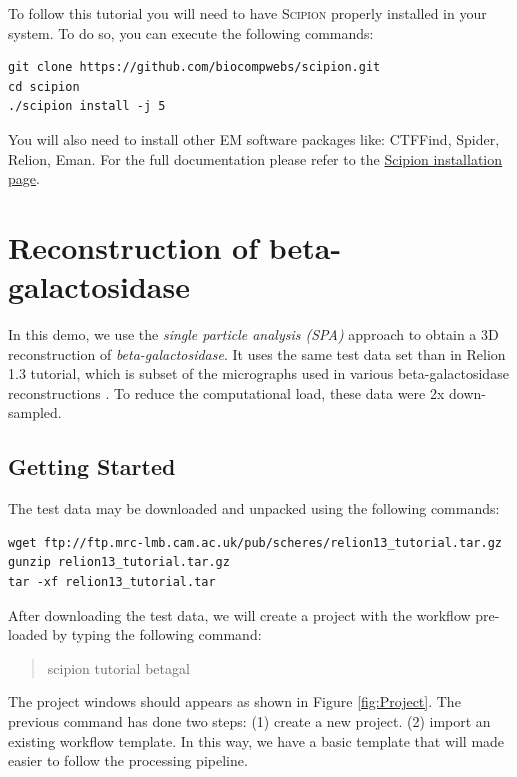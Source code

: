 \documentclass[12pt]{article} %
\newcommand{\scipion}{\textsc{Scipion} }
\newenvironment{command}{\tt\begin{quote}}{\end{quote}}
\begin{document}
To follow this tutorial you will need to have \scipion properly installed
in your system. To do so, you can execute the following commands:

\begin{verbatim} 
git clone https://github.com/biocompwebs/scipion.git
cd scipion
./scipion install -j 5
\end{verbatim}

You will also need to install other EM software packages like: 
CTFFind, Spider, Relion, Eman. For the full documentation please refer to the
\href{http://scipion.cnb.csic.es/docs/bin/view/TWiki/NewInstallation}{Scipion installation page}.


\section{Reconstruction of beta-galactosidase}

In this demo, we use the \emph{single particle analysis (SPA)}  approach to obtain
a 3D reconstruction of \emph{beta-galactosidase}. It uses the same test data set than
in Relion 1.3 tutorial, which is subset of the micrographs used in various beta-galactosidase reconstructions \citep{Chen2013, Sjors2012, Vinothkumar2014}.
To reduce
the computational load, these data were 2x down-sampled.


\subsection{Getting Started}

The test data may be downloaded and unpacked using the following commands:

\begin{verbatim}
wget ftp://ftp.mrc-lmb.cam.ac.uk/pub/scheres/relion13_tutorial.tar.gz
gunzip relion13_tutorial.tar.gz
tar -xf relion13_tutorial.tar
\end{verbatim}

After downloading the test data, we will create a project with the workflow pre-loaded
by typing the following command:

\begin{command}
 scipion tutorial betagal
\end{command}

The project windows should appears as shown in Figure \ref{fig:Project}. The previous command has done two 
steps: (1) create a new project. (2) import an existing workflow template. In this way, 
we have a basic template that will made easier to follow the processing pipeline. 
\end{document}
